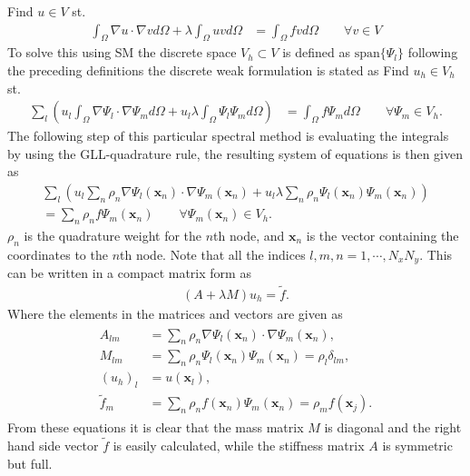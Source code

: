 Find $u\in V$ st. 
%
\begin{align}
    \int_{\Omega}\nabla u \cdot \nabla v d \Omega + \lambda \int_{\Omega} u vd \Omega 
    &= \int_{\Omega}f vd \Omega \qquad \forall v \in V
    \label{eq:Helmholtzweak}
\end{align}
%
To solve this using SM the discrete space $V_h \subset V$ is defined as $\text{span}\{\Psi_l\}$ following the preceding definitions 
the discrete weak formulation is stated as 
Find $u_h\in V_h$ st. 
%
\begin{align}
    \sum_l\left(  u_l\int_{\Omega}\nabla \Psi_l \cdot \nabla \Psi_m d \Omega + u_l\lambda \int_{\Omega} \Psi_l \Psi_md \Omega \right)
    &= \int_{\Omega}f \Psi_md \Omega \qquad \forall \Psi_m \in V_h.
    \label{eq:Helmholtzdiscrete}
\end{align}
%
The following step of this particular spectral method is evaluating the integrals by using the GLL-quadrature rule, the resulting system of equations 
is then given as 
%
\begin{align}
    \sum_l\left(  u_l\sum_n \rho_n\nabla \Psi_l(\mathbf{x}_{n}) \cdot \nabla \Psi_m(\mathbf{x}_{n}) + u_l\lambda \sum_n \rho_n \Psi_l(\mathbf{x}_{n}) \Psi_m(\mathbf{x}_{n})\right)\\
     = \sum_n \rho_nf \Psi_m(\mathbf{x}_{n})\qquad \forall \Psi_m(\mathbf{x}_{n}) \in V_h.
    \label{eq:Helmholtzquad}
\end{align}
%
$\rho_n$ is the quadrature weight for the $n$th node, and $\mathbf{x}_n$ is the vector containing the coordinates to the $n$th node.
Note that all the indices $l,m,n=1,\cdots,N_xN_y$.
This can be written in a compact matrix form as 
\begin{align}
    (A+\lambda M)u_h = \tilde f.
    \label{eq:Helmholtzmat}
\end{align}
Where the elements in the matrices and vectors are given as 
\begin{align}
    \begin{split}
        A_{lm} &= \sum_n \rho_n\nabla \Psi_l(\mathbf{x}_{n}) \cdot \nabla \Psi_m(\mathbf{x}_{n}),\\
        M_{lm} &= \sum_n \rho_n \Psi_l(\mathbf{x}_{n}) \Psi_m(\mathbf{x}_{n}) = \rho_l\delta_{lm},\\
        (u_h)_l & = u(\mathbf{x}_l), \\
        \tilde f_m &= \sum_n \rho_n f(\mathbf{x}_{n}) \Psi_m(\mathbf{x}_{n}) = \rho_m f(\mathbf{x}_{j}).
    \end{split}
    \label{eq:Helmholtzmatelem}
\end{align}
From these equations it is clear that the mass matrix $M$ is diagonal and the right hand side vector $\tilde f$ is easily calculated, 
while the stiffness matrix $A$ is symmetric but full.


